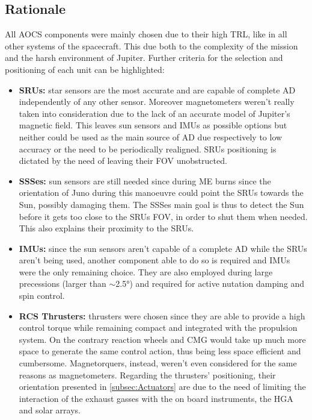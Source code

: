 \subsection{Rationale}
\label{subsec:Rationale}

All AOCS components were mainly chosen due to their high TRL, like in all other systems of the spacecraft. This due both to the complexity of the mission and the harsh environment of Jupiter. Further criteria for the selection and positioning of each unit can be highlighted:
\begin{itemize}
    \item \textbf{SRUs:} star sensors are the most accurate and are capable of complete AD independently of any other sensor. Moreover magnetometers weren't really taken into consideration due to the lack of an accurate model of Jupiter's magnetic field. This leaves sun sensors and IMUs as possible options but neither could be used as the main source of AD due respectively to low accuracy or the need to be periodically realigned. SRUs positioning is dictated by the need of leaving their FOV unobstructed.
    \item \textbf{SSSes:} sun sensors are still needed since during ME burns since the orientation of Juno during this manoeuvre could point the SRUs towards the Sun, possibly damaging them. The SSSes main goal is thus to detect the Sun before it gets too close to the SRUs FOV, in order to shut them when needed. This also explains their proximity to the SRUs.
    \item \textbf{IMUs:} since the sun sensors aren't capable of a complete AD while the SRUs aren't being used, another component able to do so is required and IMUs were the only remaining choice. They are also employed during large precessions (larger than $\sim$2.5°) and required for active nutation damping and spin control.
    \item \textbf{RCS Thrusters:} thrusters were chosen since they are able to provide a high control torque while remaining compact and integrated with the propulsion system. On the contrary reaction wheels and CMG would take up much more space to generate the same control action, thus being less space efficient and cumbersome. Magnetorquers, instead, weren't even considered for the same reasons as magnetometers. Regarding the thrusters' positioning, their orientation presented in \autoref{subsec:Actuators} are due to the need of limiting the interaction of the exhaust gasses with the on board instruments, the HGA and solar arrays.     
\end{itemize}  
